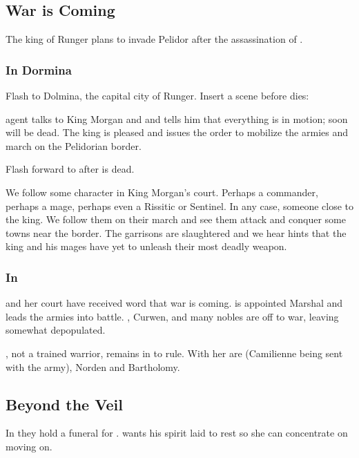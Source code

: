 \subsection{War is Coming}
The king of Runger plans to invade Pelidor after the assassination of \rayuth[\Icor]. 





\subsubsection{In Dormina}
Flash to Dolmina, the capital city of Runger. 
Insert a scene before \Icor{} dies: 

 agent talks to King Morgan and and tells him that everything is in motion; soon \Icor{} will be dead. 
The king is pleased and issues the order to mobilize the armies and march on the Pelidorian border.

Flash forward to after \Icor{} is dead. 

We follow some character in King Morgan's court. 
Perhaps a commander, perhaps a mage, perhaps even a Rissitic or Sentinel. 
In any case, someone close to the king. 
We follow them on their march and see them attack and conquer some towns near the border. 
The garrisons are slaughtered and we hear hints that the king and his mages have yet to unleash their most deadly weapon. 





\subsubsection{In \Malcur}
\Tiroco{} and her court have received word that war is coming. 
 is appointed Marshal and leads the armies into battle. 
\Cobrel, Curwen, \Dornaer{} and many nobles are off to war, leaving \Malcur somewhat depopulated. 

\Tiroco{}, not a trained warrior, remains in \Malcur to rule. 
With her are \Vincerre{} (Camilienne being sent with the army), Norden and Bartholomy. 









\subsection{Beyond the Veil}
In \Malcur they hold a funeral for \Icor. \Tiroco{} wants his spirit laid to rest so she can concentrate on moving on. 

